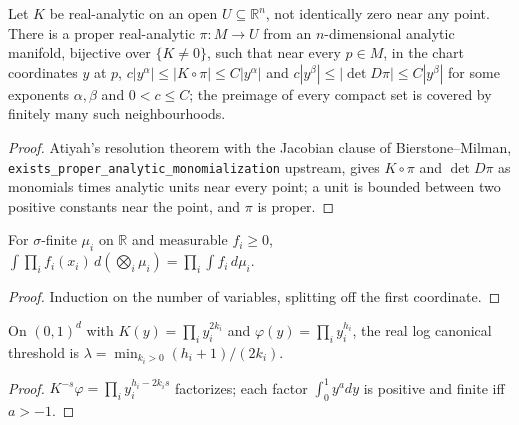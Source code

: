 \begin{theorem}\label{thm:hironaka_monomial_bounds}
\leanok
Let $K$ be real-analytic on an open $U\subseteq\mathbb R^n$, not identically zero near any point.
There is a proper real-analytic $\pi:M\to U$ from an $n$-dimensional analytic manifold, bijective
over $\{K\neq0\}$, such that near every $p\in M$, in the chart coordinates $y$ at $p$,
$c|y^{\alpha}|\le|K\circ\pi|\le C|y^{\alpha}|$ and $c|y^{\beta}|\le|\det D\pi|\le C|y^{\beta}|$ for
some exponents $\alpha,\beta$ and $0<c\le C$; the preimage of every compact set is covered by
finitely many such neighbourhoods.
\end{theorem}
\begin{proof}
\leanok
Atiyah's resolution theorem with the Jacobian clause of Bierstone--Milman,
\texttt{exists\_proper\_analytic\_monomialization} upstream, gives $K\circ\pi$ and $\det D\pi$ as
monomials times analytic units near every point; a unit is bounded between two positive constants
near the point, and $\pi$ is proper.
\end{proof}

\begin{lemma}\label{lem:lintegral_fin_prod}
\leanok
For $\sigma$-finite $\mu_i$ on $\mathbb R$ and measurable $f_i\ge0$,
$\int\prod_if_i(x_i)\,d(\bigotimes_i\mu_i)=\prod_i\int f_i\,d\mu_i$.
\end{lemma}
\begin{proof}
\leanok
Induction on the number of variables, splitting off the first coordinate.
\end{proof}

\begin{theorem}\label{thm:normal_crossing_rlct}
\leanok
{}
On $(0,1)^d$ with $K(y)=\prod_iy_i^{2k_i}$ and $\varphi(y)=\prod_iy_i^{h_i}$, the real log canonical
threshold is $\lambda=\min_{k_i>0}(h_i+1)/(2k_i)$.
\end{theorem}
\begin{proof}
\leanok
$K^{-s}\varphi=\prod_iy_i^{h_i-2k_is}$ factorizes; each factor $\int_0^1y^{a}dy$ is positive and
finite iff $a>-1$.
\end{proof}

